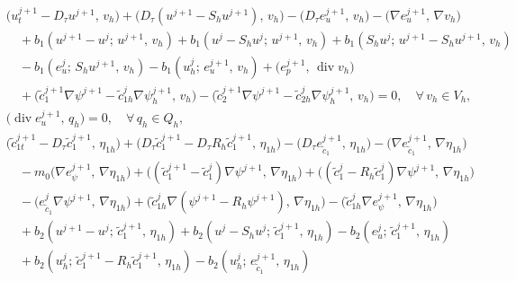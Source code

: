 \begin{align}
  &\bigl(u_{t}^{j+1} - D_{\tau}u^{j+1},\, v_{h}\bigr)
   + \bigl(D_{\tau}(u^{j+1} - S_{h}u^{j+1}),\, v_{h}\bigr)
   - \bigl(D_{\tau}e_{u}^{j+1},\, v_{h}\bigr)
   - \bigl(\nabla e_{u}^{j+1},\, \nabla v_{h}\bigr) \nonumber\\
  &\quad + b_{1}(u^{j+1}-u^{j};\, u^{j+1},\, v_{h})
   + b_{1}(u^{j} - S_{h}u^{j};\, u^{j+1},\, v_{h})
   + b_{1}(S_{h}u^{j};\, u^{j+1} - S_{h}u^{j+1},\, v_{h}) \nonumber\\
  &\quad - b_{1}(e_{u}^{j};\, S_{h}u^{j+1},\, v_{h})
   - b_{1}(u_{h}^{j};\, e_{u}^{j+1},\, v_{h})
   + \bigl(e_{p}^{j+1},\, \operatorname{div} v_{h}\bigr) \nonumber\\
  &\quad + \bigl(\tilde{c}_{1}^{j+1}\nabla\psi^{j+1}
             - \tilde{c}_{1h}^{j}\nabla\psi_{h}^{j+1},\, v_{h}\bigr)
   - \bigl(\tilde{c}_{2}^{j+1}\nabla\psi^{j+1}
             - \tilde{c}_{2h}^{j}\nabla\psi_{h}^{j+1},\, v_{h}\bigr)
   = 0, \quad \forall\, v_{h}\in V_{h},
  \label{eq:err-u}\\[4pt]
  &\bigl(\operatorname{div} e_{u}^{j+1},\, q_{h}\bigr) = 0,
   \quad \forall\, q_{h}\in Q_{h},
  \label{eq:err-divu}\\[4pt]
  &\bigl(\tilde{c}_{1t}^{j+1} - D_{\tau}\tilde{c}_{1}^{j+1},\, \eta_{1h}\bigr)
   + \bigl(D_{\tau}\tilde{c}_{1}^{j+1} - D_{\tau}R_{h}\tilde{c}_{1}^{j+1},\, \eta_{1h}\bigr)
   - \bigl(D_{\tau}e_{\tilde{c}_{1}}^{j+1},\, \eta_{1h}\bigr)
   - \bigl(\nabla e_{\tilde{c}_{1}}^{j+1},\, \nabla\eta_{1h}\bigr) \nonumber\\
  &\quad - m_{0}\bigl(\nabla e_{\psi}^{j+1},\, \nabla\eta_{1h}\bigr)
   + \bigl((\tilde{c}_{1}^{j+1} - \tilde{c}_{1}^{j})\nabla\psi^{j+1},\, \nabla\eta_{1h}\bigr)
   + \bigl((\tilde{c}_{1}^{j} - R_{h}\tilde{c}_{1}^{j})\nabla\psi^{j+1},\, \nabla\eta_{1h}\bigr) \nonumber\\
  &\quad - \bigl(e_{\tilde{c}_{1}}^{j}\nabla\psi^{j+1},\, \nabla\eta_{1h}\bigr)
   + \bigl(\tilde{c}_{1h}^{j}\nabla(\psi^{j+1} - R_{h}\psi^{j+1}),\, \nabla\eta_{1h}\bigr)
   - \bigl(\tilde{c}_{1h}^{j}\nabla e_{\psi}^{j+1},\, \nabla\eta_{1h}\bigr) \nonumber\\
  &\quad + b_{2}(u^{j+1}-u^{j};\, \tilde{c}_{1}^{j+1},\, \eta_{1h})
   + b_{2}(u^{j} - S_{h}u^{j};\, \tilde{c}_{1}^{j+1},\, \eta_{1h})
   - b_{2}(e_{u}^{j};\, \tilde{c}_{1}^{j+1},\, \eta_{1h}) \nonumber\\
  &\quad + b_{2}(u_{h}^{j};\, \tilde{c}_{1}^{j+1} - R_{h}\tilde{c}_{1}^{j+1},\, \eta_{1h})
   - b_{2}(u_{h}^{j};\, e_{\tilde{c}_{1}}^{j+1},\, \eta_{1h})

\end{align}
